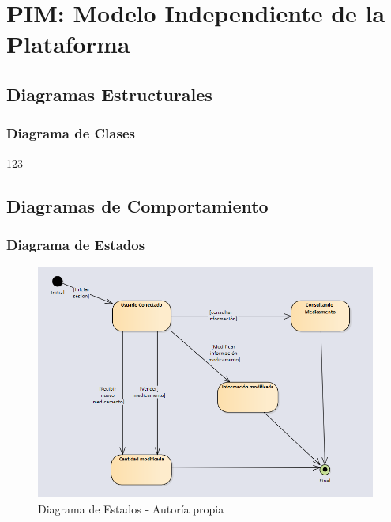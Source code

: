 \section{PIM: Modelo Independiente de la Plataforma}
\subsection{Diagramas Estructurales}
\subsubsection{Diagrama de Clases}
123
\subsection{ Diagramas de Comportamiento}
\subsubsection{ Diagrama de Estados}

\begin{center}
    \begin{figure}[htb]
        \centering
        \includegraphics[width = 1.0\textwidth] {libro/capitulo5/img/Estados.PNG}
        \caption{Diagrama de Estados - Autor\'ia propia}
        \label{fig:my_label}
    \end{figure}
\end{center}
